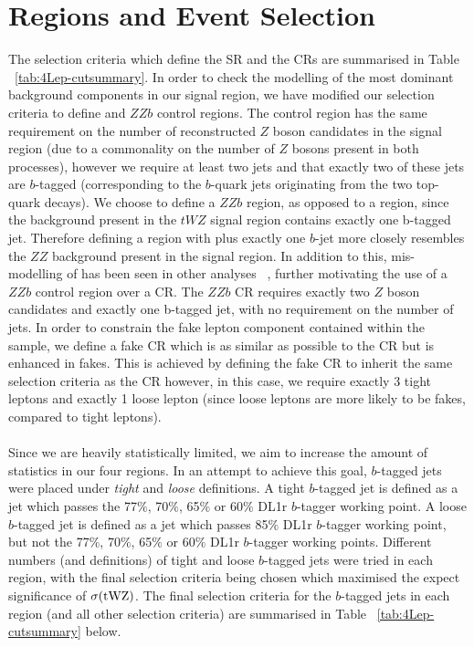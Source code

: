 \section{Regions and Event Selection}
\label{sec:regionsAndEventSelection}


The selection criteria which define the SR and the CRs are summarised in Table ~\ref{tab:4Lep-cutsummary}. In order to check the modelling of the most dominant background components in our signal region, we have modified our selection criteria to define \ttZ and $ZZb$ control regions. The \ttZ control region has the same requirement on the number of reconstructed $Z$ boson candidates in the signal region (due to a commonality on the number of $Z$ bosons present in both processes), however we require at least two jets and that exactly two of these jets are $b$-tagged (corresponding to the $b$-quark jets originating from the two top-quark decays). We choose to define a $ZZb$ region, as opposed to a \ZZ region, since the \ZZ background present in the $tWZ$ signal region contains exactly one b-tagged jet. Therefore defining a region with \ZZ plus exactly one $b$-jet more closely resembles the $ZZ$ background present in the signal region. In addition to this, mis-modelling of \ZZ has been seen in other analyses ~\cite{Aaboud:2019, ppToZZ:CMSpaper}, further motivating the use of a $ZZb$ control region over a \ZZ CR. The $ZZb$ CR requires exactly two $Z$ boson candidates and exactly one b-tagged jet, with no requirement on the number of jets. In order to constrain the fake lepton component contained within the \ttZ sample, we define a \ttZ fake CR which is as similar as possible to the \ttZ CR but is enhanced in fakes. This is achieved by defining the \ttZ fake CR to inherit the same selection criteria as the \ttZ CR however, in this case, we require exactly 3 tight leptons and exactly 1 loose lepton (since loose leptons are more likely to be fakes, compared to tight leptons).\\\\
Since we are heavily statistically limited, we aim to increase the amount of statistics in our four regions. In an attempt to achieve this goal, $b$-tagged jets were placed under \textit{tight} and \textit{loose} definitions. A tight $b$-tagged jet is defined as a jet which passes the 77$\%$, 70$\%$, 65$\%$ or 60$\%$ DL1r $b$-tagger working point. A loose $b$-tagged jet is defined as a jet which passes 85$\%$ DL1r $b$-tagger working point, but not the 77$\%$, 70$\%$, 65$\%$ or 60$\%$ DL1r $b$-tagger working points. Different numbers (and definitions) of tight and loose $b$-tagged jets were tried in each region, with the final selection criteria being chosen which maximised the expect significance of $\sigma(\tWZ)$. The final selection criteria for the $b$-tagged jets in each region (and all other selection criteria) are summarised in Table ~\ref{tab:4Lep-cutsummary} below.







